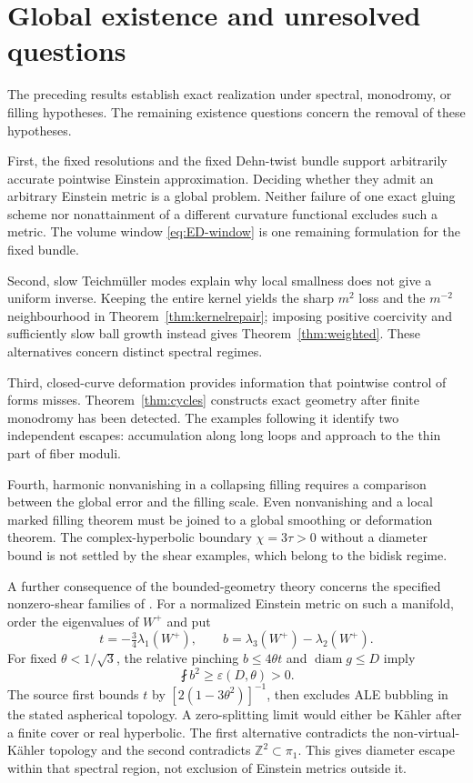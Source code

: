 \documentclass[11pt,a4paper]{article}
\theoremstyle{definition}\newtheorem{definition}[theorem]{Definition}
\theoremstyle{remark}\newtheorem{remark}[theorem]{Remark}
\DeclareMathOperator{\diam}{diam}
\newcommand{\Z}{\mathbb Z}
\newcommand{\avint}{\mathop{\fint}}
\begin{document}
\section{Global existence and unresolved questions}
The preceding results establish exact realization under spectral, monodromy, or filling hypotheses. The remaining existence questions concern the removal of these hypotheses.

First, the fixed resolutions and the fixed Dehn-twist bundle support arbitrarily accurate pointwise Einstein approximation. Deciding whether they admit an arbitrary Einstein metric is a global problem. Neither failure of one exact gluing scheme nor nonattainment of a different curvature functional excludes such a metric. The volume window \eqref{eq:ED-window} is one remaining formulation for the fixed bundle.

Second, slow Teichm\"uller modes explain why local smallness does not give a uniform inverse. Keeping the entire kernel yields the sharp $m^2$ loss and the $m^{-2}$ neighbourhood in Theorem~\ref{thm:kernelrepair}; imposing positive coercivity and sufficiently slow ball growth instead gives Theorem~\ref{thm:weighted}. These alternatives concern distinct spectral regimes.

Third, closed-curve deformation provides information that pointwise control of forms misses. Theorem~\ref{thm:cycles} constructs exact geometry after finite monodromy has been detected. The examples following it identify two independent escapes: accumulation along long loops and approach to the thin part of fiber moduli.

Fourth, harmonic nonvanishing in a collapsing filling requires a comparison between the global error and the filling scale. Even nonvanishing and a local marked filling theorem must be joined to a global smoothing or deformation theorem. The complex-hyperbolic boundary $\chi=3\tau>0$ without a diameter bound is not settled by the shear examples, which belong to the bidisk regime.

A further consequence of the bounded-geometry theory concerns the specified nonzero-shear families of \cite{source-spectral}. For a normalized Einstein metric on such a manifold, order the eigenvalues of $W^+$ and put
\[
 t=-\tfrac34\lambda_1(W^+),\qquad b=\lambda_3(W^+)-\lambda_2(W^+).
\]
For fixed $\theta<1/\sqrt3$, the relative pinching $b\le4\theta t$ and $\diam g\le D$ imply
\[
 \avint b^2\ge\varepsilon(D,\theta)>0.
\]
The source first bounds $t$ by $[2(1-3\theta^2)]^{-1}$, then excludes ALE bubbling in the stated aspherical topology. A zero-splitting limit would either be K\"ahler after a finite cover or real hyperbolic. The first alternative contradicts the non-virtual-K\"ahler topology and the second contradicts $\Z^2\subset\pi_1$. This gives diameter escape within that spectral region, not exclusion of Einstein metrics outside it.
\end{document}
